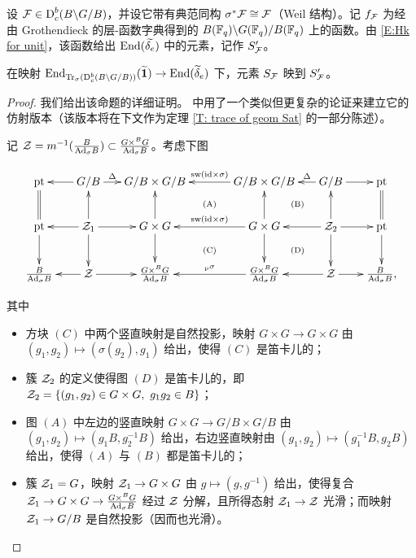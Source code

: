 设 ${\mathcal F}\in \operatorname{D}_c^b(B\backslash G/B)$，并设它带有典范同构 $\sigma^*{\mathcal F}\cong {\mathcal F}$（Weil 结构）。记 $f_{\mathcal F}$ 为经由 Grothendieck 的层-函数字典得到的 $B({\mathbb F}_q)\backslash G({\mathbb F}_q)/B({\mathbb F}_q)$ 上的函数。由 \eqref{E:Hk for unit}，该函数给出 ${\operatorname{End}}(\widetilde{\delta_e})$ 中的元素，记作 $S'_{\mathcal F}$。
\begin{prop}
\label{P:S=T finite}
在映射 ${\operatorname{End}}_{{\operatorname{Tr}}_{\sigma}(\operatorname{D}^b_c(B\backslash G/B))}(\widetilde{\mathbf{1}})\to {\operatorname{End}} (\widetilde{\delta}_e)$ 下，元素 $S_{\mathcal F}$ 映到 $S'_{{\mathcal F}}$。
\end{prop}
\begin{proof}
我们给出该命题的详细证明。
\cite[\S 6.3]{XZ} 中用了一个类似但更复杂的论证来建立它的仿射版本（该版本将在下文作为定理 \ref{T: trace of geom Sat} 的一部分陈述）。

记 ${\mathcal Z}=m^{-1}(\frac{B}{{\operatorname{Ad}}_\sigma B})\subset \frac{G\times^BG}{{\operatorname{Ad}}_\sigma B}$。考虑下图
\begin{small}
\begin{equation}\label{E: cal coh corr to local}
\xymatrix@C=15pt{
\on{pt}&\ar[l] G/B\ar^-{\Delta}[r]& G/B\times G/B\ar@{}[drr]|{\mathrm{(A)}}&& G/B\times G/B\ar_-{\on{sw}(\id\times \sigma)}[ll]\ar@{}[dr]|{\mathrm{(B)}}&\ar_-\Delta[l] G/B\ar[r]& \on{pt}\\
\on{pt}\ar[d]\ar@{=}[u]&\ar[l] \mZ_1\ar[r]\ar[d]\ar[u]& G\times G\ar[d]\ar[u]\ar@{}[drr]|{\mathrm{(C)}}&&\ar_-{\on{sw}(\id\times \sigma)}[ll]G\times G\ar[d]\ar[u]\ar@{}[dr]|{\mathrm{(D)}}&\ar[l]\mZ_2\ar[r]\ar[d]\ar[u]&\on{pt}\ar[d]\ar@{=}[u]\\
\frac{B}{\Ad_\sigma B} & \mZ\ar[l]\ar[r]& \frac{G\times^BG}{\Ad_\sigma B}&&\ar_{\pFr}[ll]\frac{G\times^BG}{\Ad_\sigma B}&\ar[l] \mZ\ar[r]& \frac{B}{\Ad_\sigma B},
}
\end{equation}
\end{small}
其中
\begin{itemize}
\item 方块 $(C)$ 中两个竖直映射是自然投影，映射 $G\times G\to G\times G$ 由 $(g_1, g_2)\mapsto (\sigma(g_2), g_1)$ 给出，使得 $(C)$ 是笛卡儿的；
\item 簇 ${\mathcal Z}_2$ 的定义使得图 $(D)$ 是笛卡儿的，即 ${\mathcal Z}_2=\{(g_1,g_2)\in G\times G,\ g_1g_2\in B\}$；
\item 图 $(A)$ 中左边的竖直映射 $G\times G\to G/B\times G/B$ 由 $(g_1,g_2)\mapsto (g_1B, g_2^{-1}B)$ 给出，右边竖直映射由 $(g_1,g_2)\mapsto (g_1^{-1}B,g_2B)$ 给出，使得 $(A)$ 与 $(B)$ 都是笛卡儿的；
\item 簇 ${\mathcal Z}_1=G$，映射 ${\mathcal Z}_1\to G\times G$ 由 $g\mapsto (g,g^{-1})$ 给出，使得复合 ${\mathcal Z}_1\to G\times G\to \frac{G\times^BG}{{\operatorname{Ad}}_\sigma B}$ 经过 ${\mathcal Z}$ 分解，且所得态射 ${\mathcal Z}_1 \to {\mathcal Z}$ 光滑；而映射 ${\mathcal Z}_1\to G/B$ 是自然投影（因而也光滑）。

\end{itemize}
\end{proof}
